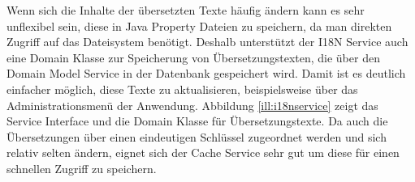 Wenn sich die Inhalte der übersetzten Texte häufig ändern kann es sehr unflexibel
sein, diese in Java Property Dateien zu speichern, da man direkten Zugriff auf
das Dateisystem benötigt. Deshalb unterstützt der I18N Service auch eine Domain
Klasse zur Speicherung von Übersetzungstexten, die über den Domain Model Service
in der Datenbank gespeichert wird. Damit ist es deutlich einfacher möglich,
diese Texte zu aktualisieren, beispielsweise über das Administrationsmenü der
Anwendung. Abbildung \ref{ill:i18nservice} zeigt das Service Interface und die
Domain Klasse für Übersetzungstexte. Da auch die Übersetzungen über einen
eindeutigen Schlüssel zugeordnet werden und sich relativ selten ändern, eignet
sich der Cache Service sehr gut um diese für einen schnellen Zugriff zu
speichern.